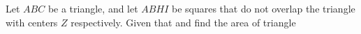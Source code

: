 Let $ABC$ be a triangle, and let   $ABHI$ be squares that do not overlap the triangle with centers   $Z$ respectively. Given that   and  find the area of triangle 